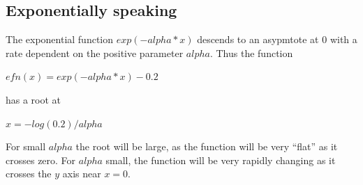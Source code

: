 \documentclass[11pt,letterpaper]{article}
\begin{document}
\subsection{Exponentially speaking}

The exponential function $exp(-alpha*x)$ descends to an asypmtote at 0 with a
rate dependent on the positive parameter $alpha$. Thus the function

$efn(x) = exp(-alpha*x) - 0.2$

has a root at

$ x = - log(0.2)/alpha $

For small $alpha$ the root will be large, as the function will be very ``flat''
as it crosses zero. For $alpha$ small, the function will be very rapidly changing
as it crosses the $y$ axis near $ x = 0 $.

\end{document}
